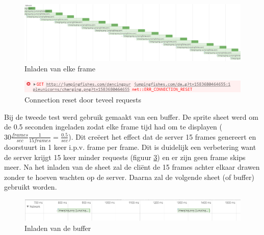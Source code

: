 \begin{figure} [H]
	\centering
	\includegraphics [scale=0.3] {img/inladen.png}
	\caption{Inladen van elke frame} \label{inladen}
\end{figure}

\begin{figure} [H]
	\centering
	\includegraphics [scale=0.7] {img/reset.png}
	\caption{Connection reset door teveel requests} \label{reset}
\end{figure}

Bij de tweede test werd gebruik gemaakt van een buffer. De sprite sheet werd om de 0.5 seconden ingeladen zodat elke frame tijd had om te displayen ($30 \frac{frames}{sec} \frac{1}{15 frames}=\frac{0.5}{sec} $). Dit creëert het effect dat de server 15 frames genereert en doorstuurt in 1 keer i.p.v. frame per frame. Dit is duidelijk een verbetering want de server krijgt 15 keer minder requests (figuur \ref{inladen2}) en er zijn geen frame skips meer. Na het inladen van de sheet zal de cliënt de 15 frames achter elkaar drawen zonder te hoeven wachten op de server. Daarna zal de volgende sheet (of buffer) gebruikt worden.

\begin{figure} [H]
	\centering
	\includegraphics [scale=0.7] {img/inladen2.png}
	\caption{Inladen van de buffer} \label{inladen2}
\end{figure}